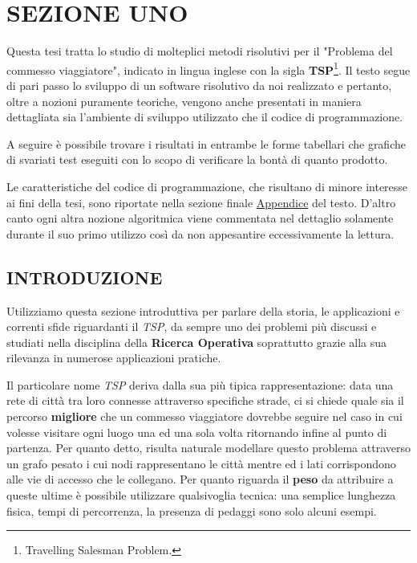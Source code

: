 \documentclass[11pt]{article}
\begin{document}
\section*{SEZIONE UNO}
\label{sec:SezioneUnoS}

Questa tesi tratta lo studio di molteplici metodi risolutivi per il "Problema del commesso viaggiatore", indicato in lingua inglese con la sigla \textbf{TSP}\footnote{Travelling Salesman Problem.}. Il testo segue di pari passo lo sviluppo di un software risolutivo da noi realizzato e pertanto, oltre a nozioni puramente teoriche, vengono anche presentati in maniera dettagliata sia l'ambiente di sviluppo utilizzato che il codice di programmazione.

A seguire è possibile trovare i risultati in entrambe le forme tabellari che grafiche di svariati test eseguiti con lo scopo di verificare la bontà di quanto prodotto.

Le caratteristiche del codice di programmazione, che risultano di minore interesse ai fini della tesi, sono riportate nella sezione finale \hyperref[sec:AppendiceS]{Appendice} del testo. D'altro canto ogni altra nozione algoritmica viene commentata nel dettaglio solamente durante il suo primo utilizzo così da non appesantire eccessivamente la lettura.

\subsection*{INTRODUZIONE}
\label{sec:IntroduzionS}

Utilizziamo questa sezione introduttiva per parlare della storia, le applicazioni e correnti sfide riguardanti il \textit{TSP}, da sempre uno dei problemi più discussi e studiati nella disciplina della \textbf{Ricerca Operativa} soprattutto grazie alla sua rilevanza in numerose applicazioni pratiche.


Il particolare nome \textit{TSP} deriva dalla sua più tipica rappresentazione: data una rete di città tra loro connesse attraverso specifiche strade, ci si chiede quale sia il percorso \textbf{migliore} che un commesso viaggiatore dovrebbe seguire nel caso in cui volesse visitare ogni luogo una ed una sola volta ritornando infine al punto di partenza. Per quanto detto, risulta naturale modellare questo problema attraverso un grafo pesato i cui nodi rappresentano le città mentre ed i lati corrispondono alle vie di accesso che le collegano. Per quanto riguarda il \textbf{peso} da attribuire a queste ultime è possibile utilizzare qualsivoglia tecnica: una semplice lunghezza fisica, tempi di percorrenza, la presenza di pedaggi sono solo alcuni esempi.
\end{document}
